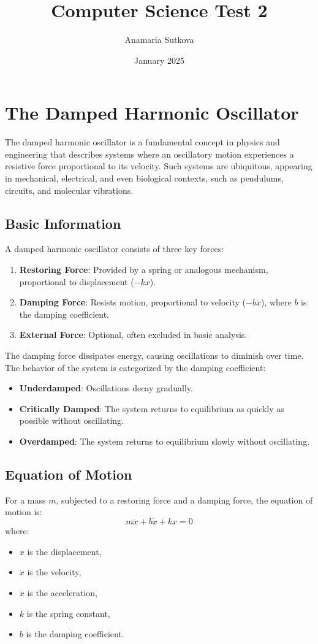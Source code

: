 \documentclass{article}
\title{Computer Science Test 2}
\author{Anamaria Sutkova}
\date{January 2025}
\begin{document}
\section*{The Damped Harmonic Oscillator}

The damped harmonic oscillator is a fundamental concept in physics and engineering that describes systems where an oscillatory motion experiences a resistive force proportional to its velocity. Such systems are ubiquitous, appearing in mechanical, electrical, and even biological contexts, such as pendulums, circuits, and molecular vibrations.

\subsection*{Basic Information}
A damped harmonic oscillator consists of three key forces:
\begin{enumerate}
    \item \textbf{Restoring Force}: Provided by a spring or analogous mechanism, proportional to displacement ($-kx$).
    \item \textbf{Damping Force}: Resists motion, proportional to velocity ($-b\dot{x}$), where $b$ is the damping coefficient.
    \item \textbf{External Force}: Optional, often excluded in basic analysis.
\end{enumerate}

The damping force dissipates energy, causing oscillations to diminish over time. The behavior of the system is categorized by the damping coefficient:
\begin{itemize}
    \item \textbf{Underdamped}: Oscillations decay gradually.
    \item \textbf{Critically Damped}: The system returns to equilibrium as quickly as possible without oscillating.
    \item \textbf{Overdamped}: The system returns to equilibrium slowly without oscillating.
\end{itemize}

\subsection*{Equation of Motion}
For a mass $m$, subjected to a restoring force and a damping force, the equation of motion is:
\[
m\ddot{x} + b\dot{x} + kx = 0
\]
where:
\begin{itemize}
    \item $x$ is the displacement,
    \item $\dot{x}$ is the velocity,
    \item $\ddot{x}$ is the acceleration,
    \item $k$ is the spring constant,
    \item $b$ is the damping coefficient.
\end{itemize}
\end{document}
